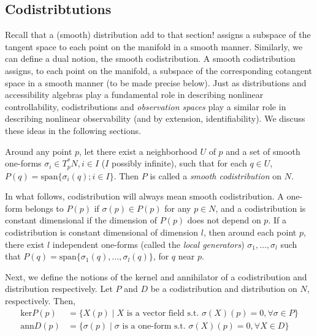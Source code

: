 \subsection{Codistribtutions}

Recall that a (smooth) distribution {\color{red}add to that section!} assigns a subspace of the tangent space to each point on the manifold in a smooth manner. Similarly, we can define a dual notion, the smooth codistribution. A smooth codistribution assigns, to each point on the manifold, a subspace of the corresponding cotangent space in a smooth manner (to be made precise below). Just as distributions and accessibility algebras play a fundamental role in describing nonlinear controllability, codistributions and \textit{observation spaces} play a similar role in describing nonlinear observability (and by extension, identifiability). We discuss these ideas in the following sections. 

\begin{defn}
Around any point $p$, let there exist a neighborhood $U$ of $p$ and a set of smooth one-forms $\sigma_i \in T^*_pN, i\in I$ ($I$ possibly infinite), such that for each $q \in U$, $P(q) = \text{span}\{\sigma_i(q); i \in I\}$. Then $P$ is called a \textit{smooth codistribution }on $N$. 
\end{defn}

In what follows, codistribution will always mean smooth codistribution. A one-form belongs to $P(p)$ if $\sigma(p) \in P(p)$ for any $p\in N$, and a codistribution is constant dimensional if the dimension of $P(p)$ does not depend on $p$. If a codistribution is constant dimensional of dimension $l$, then around each point $p$, there exist $l$ independent one-forms (called the \textit{local generators}) $\sigma_1, \dots, \sigma_l$ such that $P(q) = \text{span}\{\sigma_1(q), \dots, \sigma_l(q)\}$, for $q$ near $p$. 

Next, we define the notions of the kernel and annihilator of a codistribution and distribution respectively. Let $P$ and $D$ be a codistribution and distribution on $N$, respectively. Then, 
\begin{equation}
    \begin{aligned}
        \text{ker}P(p) &={} \{X(p) \mid X \text{ is a vector field s.t. } \sigma(X)(p) = 0, \forall \sigma \in P\}\\
        \text{ann}D(p) &={} \{\sigma(p) \mid \sigma \text{ is a one-form s.t. } \sigma(X)(p) = 0, \forall X \in D\}
    \end{aligned}   
\end{equation}

